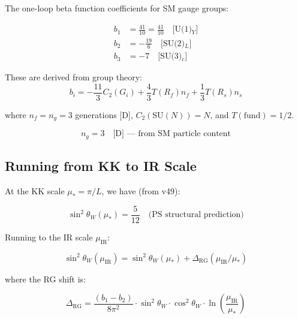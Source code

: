 \documentclass[11pt,a4paper]{article}
\theoremstyle{definition}
\begin{document}
The one-loop beta function coefficients for SM gauge groups:

\begin{align}
\label{eq:b1_sm}
b_1 &= \frac{41}{10} = \frac{41}{10} \quad \text{[U(1)$_Y$]} \\
\label{eq:b2_sm}
b_2 &= -\frac{19}{6} \quad \text{[SU(2)$_L$]} \\
\label{eq:b3_sm}
b_3 &= -7 \quad \text{[SU(3)$_c$]}
\end{align}

These are derived from group theory:
\begin{equation}
\label{eq:beta_general}
b_i = -\frac{11}{3} C_2(G_i) + \frac{4}{3} T(R_f) n_f + \frac{1}{3} T(R_s) n_s
\end{equation}

where $n_f = n_g = 3$ generations [D], $C_2(\text{SU}(N)) = N$, and $T(\text{fund}) = 1/2$.

\begin{equation}
\label{eq:ng_derived}
n_g = 3 \quad \text{[D] — from SM particle content}
\end{equation}

\subsection{Running from KK to IR Scale}
\label{subsec:running_kk_ir}

At the KK scale $\mu_* = \pi/L$, we have (from v49):

\begin{equation}
\label{eq:sw2_kk}
\sin^2\theta_W(\mu_*) = \frac{5}{12} \quad \text{(PS structural prediction)}
\end{equation}

Running to the IR scale $\mu_{\text{IR}}$:

\begin{equation}
\label{eq:sw2_running}
\sin^2\theta_W(\mu_{\text{IR}}) = \sin^2\theta_W(\mu_*) + \Delta_{\text{RG}}(\mu_{\text{IR}}/\mu_*)
\end{equation}

where the RG shift is:

\begin{equation}
\label{eq:delta_rg}
\Delta_{\text{RG}} = \frac{(b_1 - b_2)}{8\pi^2} \cdot \sin^2\theta_W \cdot \cos^2\theta_W \cdot \ln\left(\frac{\mu_{\text{IR}}}{\mu_*}\right)
\end{equation}
\end{document}
